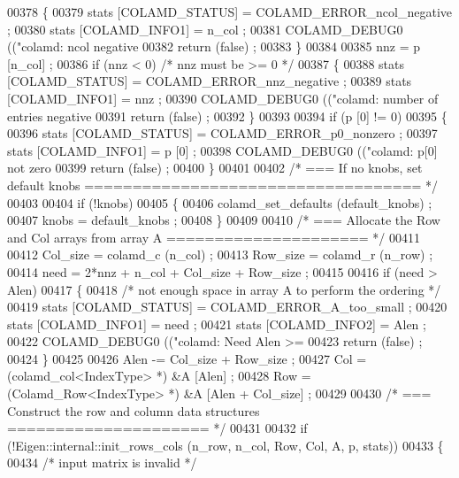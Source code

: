 \begin{DoxyCode}
{{{00378   \{
00379     stats [COLAMD\_STATUS] = COLAMD\_ERROR\_ncol\_negative ;
00380     stats [COLAMD\_INFO1] = n\_col ;
00381     COLAMD\_DEBUG0 ((\textcolor{stringliteral}{"colamd: ncol negative %
00382     \textcolor{keywordflow}{return} (\textcolor{keyword}{false}) ;
00383   \}
00384   
00385   nnz = p [n\_col] ;
00386   \textcolor{keywordflow}{if} (nnz < 0)  \textcolor{comment}{/* nnz must be >= 0 */}
00387   \{
00388     stats [COLAMD\_STATUS] = COLAMD\_ERROR\_nnz\_negative ;
00389     stats [COLAMD\_INFO1] = nnz ;
00390     COLAMD\_DEBUG0 ((\textcolor{stringliteral}{"colamd: number of entries negative %
00391     \textcolor{keywordflow}{return} (\textcolor{keyword}{false}) ;
00392   \}
00393   
00394   \textcolor{keywordflow}{if} (p [0] != 0)
00395   \{
00396     stats [COLAMD\_STATUS] = COLAMD\_ERROR\_p0\_nonzero ;
00397     stats [COLAMD\_INFO1] = p [0] ;
00398     COLAMD\_DEBUG0 ((\textcolor{stringliteral}{"colamd: p[0] not zero %
00399     \textcolor{keywordflow}{return} (\textcolor{keyword}{false}) ;
00400   \}
00401   
00402   \textcolor{comment}{/* === If no knobs, set default knobs =================================== */}
00403   
00404   \textcolor{keywordflow}{if} (!knobs)
00405   \{
00406     colamd\_set\_defaults (default\_knobs) ;
00407     knobs = default\_knobs ;
00408   \}
00409   
00410   \textcolor{comment}{/* === Allocate the Row and Col arrays from array A ===================== */}
00411   
00412   Col\_size = colamd\_c (n\_col) ;
00413   Row\_size = colamd\_r (n\_row) ;
00414   need = 2*nnz + n\_col + Col\_size + Row\_size ;
00415   
00416   \textcolor{keywordflow}{if} (need > Alen)
00417   \{
00418     \textcolor{comment}{/* not enough space in array A to perform the ordering */}
00419     stats [COLAMD\_STATUS] = COLAMD\_ERROR\_A\_too\_small ;
00420     stats [COLAMD\_INFO1] = need ;
00421     stats [COLAMD\_INFO2] = Alen ;
00422     COLAMD\_DEBUG0 ((\textcolor{stringliteral}{"colamd: Need Alen >= %
00423     \textcolor{keywordflow}{return} (\textcolor{keyword}{false}) ;
00424   \}
00425   
00426   Alen -= Col\_size + Row\_size ;
00427   Col = (colamd\_col<IndexType> *) &A [Alen] ;
00428   Row = (Colamd\_Row<IndexType> *) &A [Alen + Col\_size] ;
00429 
00430   \textcolor{comment}{/* === Construct the row and column data structures ===================== */}
00431   
00432   \textcolor{keywordflow}{if} (!Eigen::internal::init\_rows\_cols (n\_row, n\_col, Row, Col, A, p, stats))
00433   \{
00434     \textcolor{comment}{/* input matrix is invalid */}
}}}}}}}
\end{DoxyCode}
